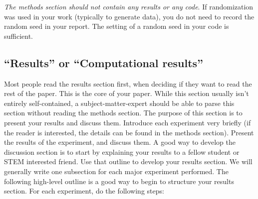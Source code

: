 \documentclass[]{article}
\begin{document}
\emph{The methods section should not contain any results or any code}. If randomization was used in your work (typically to generate data), you do not need to record the random seed in your report. The setting of a random seed in your code is sufficient.

\subsection{``Results'' or ``Computational results''}
Most people read the results section first, when deciding if they want to read the rest of the paper. This is the core of your paper.
While this section usually isn't entirely self-contained, a subject-matter-expert should be able to parse this section without reading the methods section. The purpose of this section is to present your results and discuss them. Introduce each experiment very briefly (if the reader is interested, the details can be found in the methods section). Present the results of the experiment, and discuss them. A good way to develop the discussion section is to start by explaining your results to a fellow student or STEM interested friend. Use that outline to develop your results section.
We will generally write one subsection for each major experiment performed.
The following high-level outline is a good way to begin to structure your results section. For each experiment, do the following steps:
\end{document}
